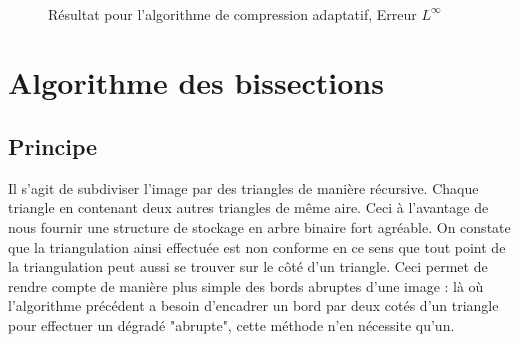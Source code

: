 \documentclass{report}
\begin{document}
\begin{figure}[ht!]
\begin{center}
{        }\\ %
    \end{center}
    \caption{%
        Résultat pour l'algorithme de compression adaptatif, Erreur $L^\infty$
    }%
   \label{fig:subfigures}
\end{figure}

\clearpage

\section{Algorithme des bissections}

\subsection{Principe}

Il s'agit de subdiviser l'image par des triangles de manière récursive. Chaque triangle en contenant deux autres triangles de même aire. Ceci à l'avantage de nous fournir une structure de stockage en arbre binaire fort agréable. On constate que la triangulation ainsi effectuée est non conforme en ce sens que tout point de la triangulation peut aussi se trouver sur le côté d'un triangle. Ceci permet de rendre compte de manière plus simple des bords abruptes d'une image : là où l'algorithme précédent a besoin d'encadrer un bord par deux cotés d'un triangle pour effectuer un dégradé "abrupte", cette méthode n'en nécessite qu'un.
\end{document}
